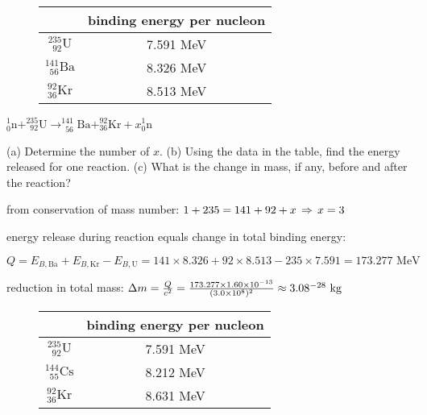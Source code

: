 \begin{wrapfigure}{r}{0.42\textwidth}
	\vspace*{-21pt}
	\flushright
	\begin{tabular}{|c|c|}
		\hline
		& binding energy per nucleon \\ \hline
		$^{235}_{\phantom{2}92}\text{U}$ & 7.591 MeV \\ \hline $^{141}_{\phantom{1}56}\text{Ba}$ & 8.326 MeV\\ \hline $^{92}_{36}\text{Kr}$ & 8.513 MeV\\ \hline
	\end{tabular}
	\vspace*{-10pt}
\end{wrapfigure}

	
{

\centering

$^1_0\text{n} + ^{235}_{\phantom{2}92}\text{U} \longrightarrow ^{141}_{\phantom{1}56}\text{Ba} + ^{92}_{36}\text{Kr} + x^1_0\text{n}$

}

\noindent (a) Determine the number of $x$. (b) Using the data in the table, find the energy released for one reaction. (c) What is the change in mass, if any, before and after the reaction?

\sol from conservation of mass number: $1+235=141+92+x \, \Rightarrow \, x=3$

energy release during reaction equals change in total binding energy:

{

\centering

$Q=E_{B,\text{Ba}} + E_{B,\text{Kr}} - E_{B,\text{U}} = 141\times8.326+92\times8.513-235\times7.591=173.277 \text{ MeV} $

}

reduction in total mass: $\Delta m = \frac{Q}{c^2} = \frac{173.277\times1.60\times10^{-13}}{(3.0\times10^8)^2} \approx 3.08\time10^{-28} \text{ kg}$ \eoe


\begin{wrapfigure}{r}{0.45\textwidth}
	\vspace*{-21pt}
	\flushright
	\begin{tabular}{|c|c|}
		\hline
		& binding energy per nucleon \\ \hline
		$^{235}_{\phantom{2}92}\text{U}$ & 7.591 MeV \\ \hline $^{144}_{\phantom{1}55}\text{Cs}$ & 8.212 MeV\\ \hline $^{92}_{36}\text{Kr}$ & 8.631 MeV\\ \hline
	\end{tabular}
	\vspace*{-10pt}
\end{wrapfigure}

